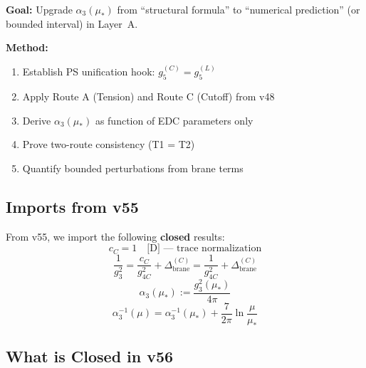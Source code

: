 \documentclass[11pt,a4paper]{article}
\theoremstyle{definition}
\begin{document}
\begin{canonbox}[v56 Scope]
\textbf{Goal:} Upgrade $\alpha_3(\mu_*)$ from ``structural formula'' to
``numerical prediction'' (or bounded interval) in Layer~A.

\textbf{Method:}
\begin{enumerate}
  \item Establish PS unification hook: $g_5^{(C)} = g_5^{(L)}$
  \item Apply Route A (Tension) and Route C (Cutoff) from v48
  \item Derive $\alpha_3(\mu_*)$ as function of EDC parameters only
  \item Prove two-route consistency (T1 = T2)
  \item Quantify bounded perturbations from brane terms
\end{enumerate}
\end{canonbox}

\subsection{Imports from v55}
\label{subsec:imports-v55}

From v55, we import the following \textbf{closed} results:
\begin{equation}
\label{eq:import-cc}
c_C = 1 \quad \text{[D] --- trace normalization}
\end{equation}
\begin{equation}
\label{eq:import-matching}
\frac{1}{g_3^2} = \frac{c_C}{g_{4C}^2} + \Delta_{\text{brane}}^{(C)}
  = \frac{1}{g_{4C}^2} + \Delta_{\text{brane}}^{(C)}
\end{equation}
\begin{equation}
\label{eq:import-alpha3-def}
\alpha_3(\mu_*) := \frac{g_3^2(\mu_*)}{4\pi}
\end{equation}
\begin{equation}
\label{eq:import-rg}
\alpha_3^{-1}(\mu) = \alpha_3^{-1}(\mu_*) + \frac{7}{2\pi}\ln\frac{\mu}{\mu_*}
\end{equation}

\subsection{What is Closed in v56}
\label{subsec:what-closed}
\end{document}
